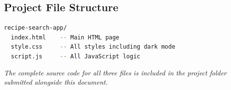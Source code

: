 \documentclass[12pt]{article}
\begin{document}
\subsection*{Project File Structure}

\begin{lstlisting}[language=bash, style=jsstyle]
recipe-search-app/
  index.html    -- Main HTML page
  style.css     -- All styles including dark mode
  script.js     -- All JavaScript logic
\end{lstlisting}

\textit{The complete source code for all three files is included in the project folder submitted alongside this document.}
\end{document}
